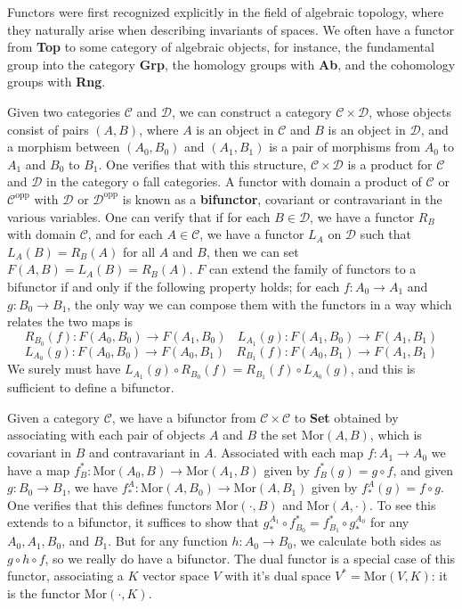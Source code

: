 \begin{example}
    Functors were first recognized explicitly in the field of algebraic topology, where they naturally arise when describing invariants of spaces. We often have a functor from {\bf Top} to some category of algebraic objects, for instance, the fundamental group into the category {\bf Grp}, the homology groups with {\bf Ab}, and the cohomology groups with {\bf Rng}.
\end{example}

Given two categories $\mathcal{C}$ and $\mathcal{D}$, we can construct a category $\mathcal{C} \times \mathcal{D}$, whose objects consist of pairs $(A,B)$, where $A$ is an object in $\mathcal{C}$ and $B$ is an object in $\mathcal{D}$, and a morphism between $(A_0, B_0)$ and $(A_1,B_1)$ is a pair of morphisms from $A_0$ to $A_1$ and $B_0$ to $B_1$. One verifies that with this structure, $\mathcal{C} \times \mathcal{D}$ is a product for $\mathcal{C}$ and $\mathcal{D}$ in the category o fall categories. A functor with domain a product of $\mathcal{C}$ or $\mathcal{C}^{\text{opp}}$ with $\mathcal{D}$ or $\mathcal{D}^{\text{opp}}$ is known as a {\bf bifunctor}, covariant or contravariant in the various variables. One can verify that if for each $B \in \mathcal{D}$, we have a functor $R_B$ with domain $\mathcal{C}$, and for each $A \in \mathcal{C}$, we have a functor $L_A$ on $\mathcal{D}$ such that $L_A(B) = R_B(A)$ for all $A$ and $B$, then we can set $F(A,B) = L_A(B) = R_B(A)$. $F$ can extend the family of functors to a bifunctor if and only if the following property holds; for each $f: A_0 \to A_1$ and $g: B_0 \to B_1$, the only way we can compose them with the functors in a way which relates the two maps is
%
\[ R_{B_0}(f): F(A_0,B_0) \to F(A_1,B_0)\ \ \ \ L_{A_1}(g): F(A_1,B_0) \to F(A_1,B_1) \]
\[ L_{A_0}(g): F(A_0,B_0) \to F(A_0,B_1)\ \ \ \ R_{B_1}(f): F(A_0,B_1) \to F(A_1,B_1) \]
%
We surely must have $L_{A_1}(g) \circ R_{B_0}(f) = R_{B_1}(f) \circ L_{A_0}(g)$, and this is sufficient to define a bifunctor.

\begin{example}
    Given a category $\mathcal{C}$, we have a bifunctor from $\mathcal{C} \times \mathcal{C}$ to {\bf Set} obtained by associating with each pair of objects $A$ and $B$ the set $\text{Mor}(A,B)$, which is covariant in $B$ and contravariant in $A$. Associated with each map $f: A_1 \to A_0$ we have a map $f^*_B: \text{Mor}(A_0,B) \to \text{Mor}(A_1,B)$ given by $f^*_B(g) = g \circ f$, and given $g: B_0 \to B_1$, we have $f_*^A: \text{Mor}(A,B_0) \to \text{Mor}(A,B_1)$ given by $f_*^A(g) = f \circ g$. One verifies that this defines functors $\text{Mor}(\cdot,B)$ and $\text{Mor}(A,\cdot)$. To see this extends to a bifunctor, it suffices to show that $g_*^{A_1} \circ f^*_{B_0} = f^*_{B_1} \circ g_*^{A_0}$ for any $A_0,A_1,B_0$, and $B_1$. But for any function $h: A_0 \to B_0$, we calculate both sides as $g \circ h \circ f$, so we really do have a bifunctor. The dual functor is a special case of this functor, associating a $K$ vector space $V$ with it's dual space $V^* = \text{Mor}(V,K)$: it is the functor $\text{Mor}(\cdot,K)$.
\end{example}

